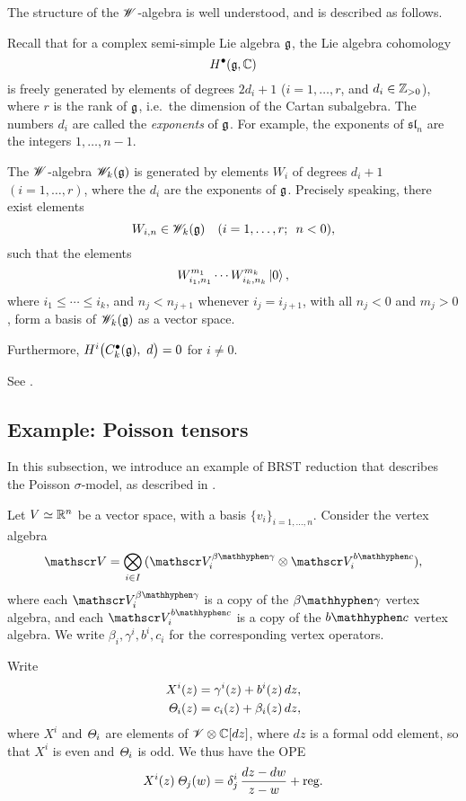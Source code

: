 The structure of the $\mathscr{W}$-algebra
is well understood,
and is described as follows.

Recall that for a complex semi-simple Lie algebra $\mathfrak{g}$,
the Lie algebra cohomology
\[
    H^\bullet (\mathfrak{g}, \mathbb{C})
\]
is freely generated by elements of degrees $2 d_i + 1$
($i = 1, \dotsc, r$, and $d_i \in \mathbb{Z}_{>0}$),
where $r$ is the rank of $\mathfrak{g}$, i.e.\ the dimension of the Cartan subalgebra.
The numbers $d_i$ are called the \emph{exponents} of $\mathfrak{g}$.
For example, the exponents of $\mathfrak{sl}_n$ are the integers $1, \dotsc, n - 1$.

\begin{theorem}
    \label{thm-w-alg}
    The $\mathscr{W}$-algebra $\mathscr{W}_k (\mathfrak{g})$
    is generated by elements $W_i$ of degrees $d_i + 1$ $(i = 1, \dotsc, r)$,
    where the $d_i$ are the exponents of $\mathfrak{g}$.
    Precisely speaking, there exist elements
    \[
        W_{i,n} \in \mathscr{W}_k (\mathfrak{g})
        \quad (i = 1, \dotsc, r; \enspace n < 0),
    \]
    such that the elements
    \[
        W_{i_1, n_1}^{m_1} \cdots W_{i_k, n_k}^{m_k} \mathinner{\mathopen{|}0\mathclose{\rangle}},
    \]
    where $i_1 \leq \cdots \leq i_k$, and $n_j < n_{j+1}$ whenever $i_j = i_{j+1}$,
    with all $n_j < 0$ and $m_j > 0$,
    form a basis of $\mathscr{W}_k (\mathfrak{g})$ as a vector space.
    
    Furthermore, $H^i \bigl( C^\bullet_k (\mathfrak{g}), \ d \bigr) = 0$ for $i \neq 0$.
\end{theorem}

See \cite[Theorem~15.1.9]{frenkel-ben-zvi}.


\subsection{Example: Poisson tensors}

In this subsection, we introduce an example of BRST reduction
that describes the Poisson $\sigma$-model,
as described in \cite[\S3.7]{voabv}.

Let $V \simeq \mathbb{R}^n$ be a vector space,
with a basis $\{ v_i \}_{i=1, \dotsc, n}$.
Consider the vertex algebra
\[
    \scrV =
    \bigotimes_{i \in I} {}
    (\scrV^{\betagamma}_i \otimes \scrV^{\bc}_i),
\]
where each $\scrV^{\betagamma}_i$ is
a copy of the $\betagamma$ vertex algebra,
and each $\scrV^{\bc}_i$
is a copy of the $\bc$ vertex algebra.
We write $\beta_i, \gamma^i, b^i, c_i$
for the corresponding vertex operators.

Write
\begin{align*}
    X^i (z) &= \gamma^i (z) + b^i (z) \, d z, \\
    \mathit{\Theta}_i (z) &= c_i (z) + \beta_i (z) \, d z,
\end{align*}
where $X^i$ and $\mathit{\Theta}_i$ are elements of
$\mathscr{V} \otimes \mathbb{C} [d z]$,
where $d z$ is a formal odd element,
so that $X^i$ is even and $\mathit{\Theta}_i$ is odd.
We thus have the OPE
\[
    X^i (z) \, \mathit{\Theta}_j (w) =
    \delta^i_j \, \frac{d z - d w}{z - w} + \text{reg.}
\]

